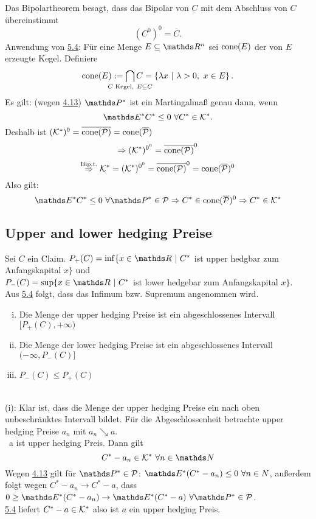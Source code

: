 Das Bipolartheorem besagt, dass das Bipolar von $C$ mit dem Abschluss von $C$ übereinstimmt
\[
(C^0)^0=\overline{C}.
\]
Anwendung von \hyperref[sub:satz_4fima]{5.4}:
Für eine Menge $E\subseteq \R^n$ sei $\operatorname{cone}(E)$ der von $E$ erzeugte Kegel.
Definiere
\[
\cone(E):= \bigcap\ablim{C\text{ Kegel},~E\subseteq C}C=\penbrace{\lambda x~|~ \lambda>0,~x\in E}.
\]
Es gilt: (wegen \hyperref[sub:satz_2fima]{4.13}) $\Pw^*$ ist ein Martingalmaß genau dann, wenn
\[
\E^*C^*\le 0~\forall C^*\in\mc{K}^*.
\]
Deshalb ist $(\mathcal{K}^*)^0=\overline{\operatorname{cone}(\mathcal{P})}=\operatorname{cone}(\overline{\mathcal{P}})$
\[
\Rightarrow (\mathcal{K}^*)^{0^0}=\overline{\operatorname{cone}(\mathcal{P})}^0
\]
\[
\stackrel{\text{Bip.t.}}{\Rightarrow} \mathcal{K}^*=(\mathcal{K^*})^{0^0}=\overline{\operatorname{cone}(\mathcal{P})}^0=\operatorname{cone}(\overline{\mathcal{P}})^0
\]
Also gilt:
\[
\E^*C^*\le 0 ~\forall \Pw^*\in\mc{P}\Rightarrow C^*\in \cone(\overline{\mc{P}})^0\Rightarrow C^*\in\mc{K}^*
\]

\subsection{Upper and lower hedging Preise}
\label{sub:upper_lower_preise}
Sei $C$ ein Claim.
$P_+(C)=\inf\{x\in \R~|~C^*$ ist upper hedgbar zum Anfangskapital $x\}$ und\\
$P_-(C)=\sup\{x\in \R~|~C^*$ ist lower hedgebar zum Anfangskapital $x \}$.\\
Aus \hyperref[sub:satz_4fima]{5.4} folgt, dass das Infimum bzw. Supremum angenommen wird.

\begin{enumerate}[(i)]
	\item Die Menge der upper hedging Preise ist ein abgeschlossenes Intervall $[P_+(C),+\infty)$
	\item Die Menge der lower hedging Preise ist ein abgeschlossenes Intervall $(-\infty,P_-(C)]$
	\item $P_-(C)\le P_+(C)$
\end{enumerate}

\\
(i): Klar ist, dass die Menge der upper hedging Preise ein nach oben unbeschränktes Intervall bildet.
Für die Abgeschlossenheit betrachte upper hedging Preise $a_n$ mit $a_n\searrow a$.\\
\zz~a ist upper hedging Preis.
Dann gilt 
\[
C^*-a_n\in \mc{K}^*~\forall n\in\N
\]
Wegen \hyperref[sub:satz_2fima]{4.13} gilt für $\Pw^*\in\mc{P}$: $\E^*(C^*-a_n)\le 0~\forall n\in N$, außerdem folgt wegen $C^*-a_n\to C^*-a$, dass $0\ge \E^*(C^*-a_n)\to \E^*(C^*-a) ~\forall \Pw^*\in \mc{P}$.\\
\hyperref[sub:satz_4fima]{5.4} liefert $C^*-a\in \mathcal{K}^*$ also ist $a$ ein upper hedging Preis.\\

